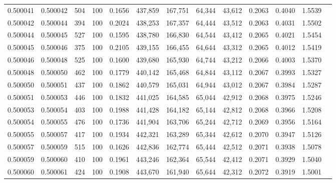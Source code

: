 \begin{tabular}{rrrrrrrrrrrrr}
0.500041 & 0.500042 &   504 & 100 &                                     0.1656 & 437,859 & 167,751 &  64,344 &  43,612 & 0.2063 & 0.4040 & 1.5539 \\
0.500042 & 0.500044 &   394 & 100 &                                     0.2024 & 438,253 & 167,357 &  64,444 &  43,512 & 0.2063 & 0.4031 & 1.5502 \\
0.500044 & 0.500045 &   527 & 100 &                                     0.1595 & 438,780 & 166,830 &  64,544 &  43,412 & 0.2065 & 0.4021 & 1.5454 \\
0.500045 & 0.500046 &   375 & 100 &                                     0.2105 & 439,155 & 166,455 &  64,644 &  43,312 & 0.2065 & 0.4012 & 1.5419 \\
0.500046 & 0.500048 &   525 & 100 &                                     0.1600 & 439,680 & 165,930 &  64,744 &  43,212 & 0.2066 & 0.4003 & 1.5370 \\
0.500048 & 0.500050 &   462 & 100 &                                     0.1779 & 440,142 & 165,468 &  64,844 &  43,112 & 0.2067 & 0.3993 & 1.5327 \\
0.500050 & 0.500051 &   437 & 100 &                                     0.1862 & 440,579 & 165,031 &  64,944 &  43,012 & 0.2067 & 0.3984 & 1.5287 \\
0.500051 & 0.500053 &   446 & 100 &                                     0.1832 & 441,025 & 164,585 &  65,044 &  42,912 & 0.2068 & 0.3975 & 1.5246 \\
0.500053 & 0.500054 &   403 & 100 &                                     0.1988 & 441,428 & 164,182 &  65,144 &  42,812 & 0.2068 & 0.3966 & 1.5208 \\
0.500054 & 0.500055 &   476 & 100 &                                     0.1736 & 441,904 & 163,706 &  65,244 &  42,712 & 0.2069 & 0.3956 & 1.5164 \\
0.500055 & 0.500057 &   417 & 100 &                                     0.1934 & 442,321 & 163,289 &  65,344 &  42,612 & 0.2070 & 0.3947 & 1.5126 \\
0.500057 & 0.500059 &   515 & 100 &                                     0.1626 & 442,836 & 162,774 &  65,444 &  42,512 & 0.2071 & 0.3938 & 1.5078 \\
0.500059 & 0.500060 &   410 & 100 &                                     0.1961 & 443,246 & 162,364 &  65,544 &  42,412 & 0.2071 & 0.3929 & 1.5040 \\
0.500060 & 0.500061 &   424 & 100 &                                     0.1908 & 443,670 & 161,940 &  65,644 &  42,312 & 0.2072 & 0.3919 & 1.5001 \\

\end{tabular}
